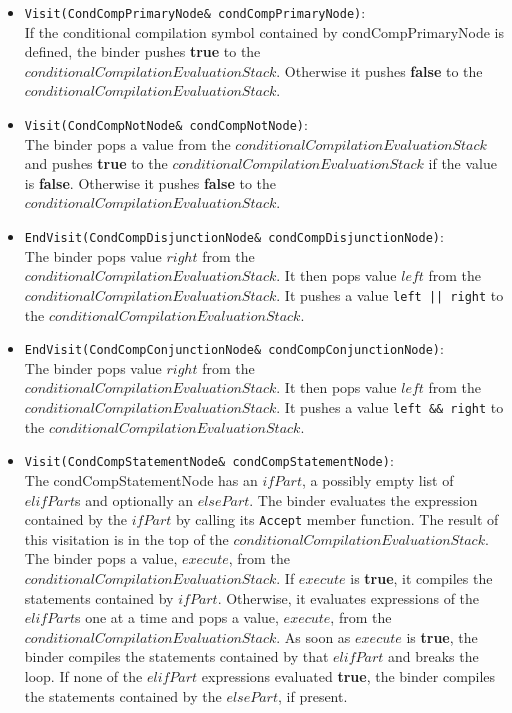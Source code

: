 \documentclass[a4paper,oneside,11pt]{book}
\theoremstyle{definition}
\begin{document}
\begin{itemize}
\item
\verb|Visit(CondCompPrimaryNode& condCompPrimaryNode)|:\\
If the conditional compilation symbol contained by condCompPrimaryNode is defined,
the binder pushes \textbf{true} to the $conditionalCompilationEvaluationStack$.
Otherwise it pushes \textbf{false} to the $conditionalCompilationEvaluationStack$.
\item
\verb|Visit(CondCompNotNode& condCompNotNode)|:\\
The binder pops a value from the $conditionalCompilationEvaluationStack$ and
pushes \textbf{true} to the $conditionalCompilationEvaluationStack$ if the value is \textbf{false}.
Otherwise it pushes \textbf{false} to the $conditionalCompilationEvaluationStack$.
\item
\verb|EndVisit(CondCompDisjunctionNode& condCompDisjunctionNode)|:\\
The binder pops value $right$ from the $conditionalCompilationEvaluationStack$.
It then pops value $left$ from the $conditionalCompilationEvaluationStack$.
It pushes a value \verb:left || right: to the $conditionalCompilationEvaluationStack$.
\item
\verb|EndVisit(CondCompConjunctionNode& condCompConjunctionNode)|:\\
The binder pops value $right$ from the $conditionalCompilationEvaluationStack$.
It then pops value $left$ from the $conditionalCompilationEvaluationStack$.
It pushes a value \verb:left && right: to the $conditionalCompilationEvaluationStack$.
\item
\verb|Visit(CondCompStatementNode& condCompStatementNode)|:\\
The condCompStatementNode has an $ifPart$, a possibly empty list of $elifPart$s and optionally an $elsePart$.
The binder evaluates the expression contained by the $ifPart$ by calling its \verb|Accept| member function.
The result of this visitation is in the top of the $conditionalCompilationEvaluationStack$.
The binder pops a value, $execute$, from the $conditionalCompilationEvaluationStack$.
If $execute$ is \textbf{true}, it compiles the statements contained by $ifPart$.
Otherwise, it evaluates expressions of the $elifPart$s one at a time and pops a value, $execute$, from the
$conditionalCompilationEvaluationStack$.
As soon as $execute$ is \textbf{true}, the binder compiles the statements contained by that $elifPart$ and breaks the loop.
If none of the $elifPart$ expressions evaluated \textbf{true}, the binder compiles the statements contained by the $elsePart$, if present.
\end{itemize}
\end{document}
